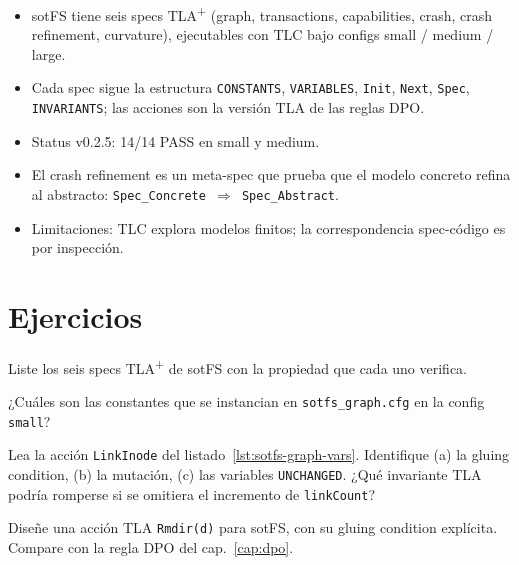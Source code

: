 \begin{itemize}
  \item sotFS tiene seis specs TLA\textsuperscript{+} (graph,
    transactions, capabilities, crash, crash refinement, curvature),
    ejecutables con TLC bajo configs small / medium / large.
  \item Cada spec sigue la estructura
    \texttt{CONSTANTS}, \texttt{VARIABLES}, \texttt{Init}, \texttt{Next},
    \texttt{Spec}, \texttt{INVARIANTS}; las acciones son la versión TLA
    de las reglas DPO.
  \item Status v0.2.5: 14/14 PASS en small y medium.
  \item El crash refinement es un meta-spec que prueba que el modelo
    concreto refina al abstracto: \texttt{Spec\_Concrete \(\Rightarrow\)
    Spec\_Abstract}.
  \item Limitaciones: TLC explora modelos finitos; la correspondencia
    spec-código es por inspección.
\end{itemize}

\section*{Ejercicios}

\begin{ejercicio}[\dificultad{$\star$}]
\label{ej:tla-1}
Liste los seis specs TLA\textsuperscript{+} de sotFS con la propiedad
que cada uno verifica.
\end{ejercicio}

\begin{ejercicio}[\dificultad{$\star$}]
\label{ej:tla-2}
¿Cuáles son las constantes que se instancian en \texttt{sotfs\_graph.cfg}
en la config \texttt{small}?
\end{ejercicio}

\begin{ejercicio}[\dificultad{$\star\star$}]
\label{ej:tla-3}
Lea la acción \texttt{LinkInode} del listado~\ref{lst:sotfs-graph-vars}.
Identifique (a) la gluing condition, (b) la mutación, (c) las
variables \texttt{UNCHANGED}. ¿Qué invariante TLA podría romperse si
se omitiera el incremento de \texttt{linkCount}?
\end{ejercicio}

\begin{ejercicio}[\dificultad{$\star\star$}]
\label{ej:tla-4}
Diseñe una acción TLA \texttt{Rmdir(d)} para sotFS, con su gluing
condition explícita. Compare con la regla DPO del cap.~\ref{cap:dpo}.
\end{ejercicio}


